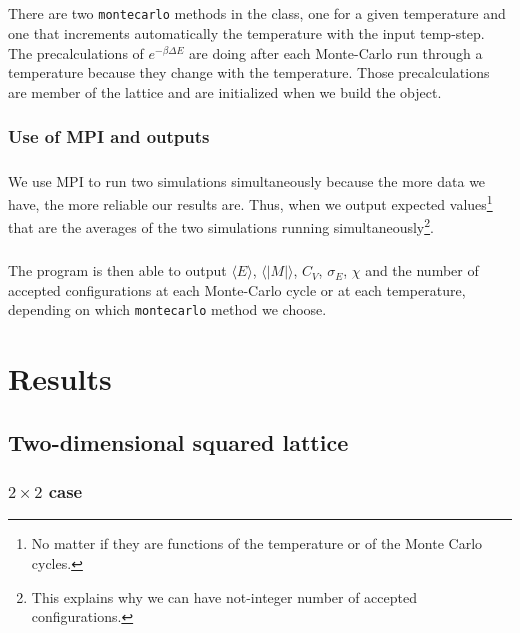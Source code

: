 \documentclass[a4paper, twoside, 11pt]{report}
\theoremstyle{theorem}
\theoremstyle{remark}
\theoremstyle{exemple}
\begin{document}
        \paragraph{}There are two \texttt{montecarlo} methods in the class, one for a given temperature and one that increments automatically the temperature with the input temp-step. The precalculations of ${e}^{-\beta\Delta E}$ are doing after each Monte-Carlo run through a temperature because they change with the temperature. Those precalculations are member of the lattice and are initialized when we build the object.  
        
        \subsection{Use of MPI and outputs}
        
        	\paragraph{}We use MPI to run two simulations simultaneously because the more data we have, the more reliable our results are. Thus, when we output expected values\footnote{No matter if they are functions of the temperature or of the Monte Carlo cycles.} that are the averages of the two simulations running simultaneously\footnote{This explains why we can have not-integer number of accepted configurations.}.
	
			\paragraph{}The program is then able to output $\langle E \rangle$, $\langle |M| \rangle$, $C_V$, $\sigma_E$, $\chi$ and the number of accepted configurations at each Monte-Carlo cycle or at each temperature, depending on which \texttt{montecarlo} method we choose.


\chapter{Results}

    \section{Two-dimensional squared lattice}
    
        \subsection{$2\times2$ case}
        
\end{document}
